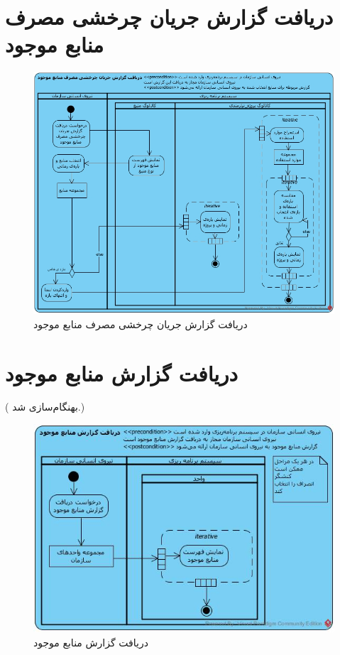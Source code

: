 \section{دریافت گزارش جریان چرخشی مصرف منابع موجود}
\begin{figure}[H]
	\centering
	\includegraphics[scale=0.6]{img/activity/UsageFlowReport}
	\caption{دریافت گزارش جریان چرخشی مصرف منابع موجود}
\end{figure}


\newpage
\section{دریافت گزارش منابع موجود}
({\color{red} بهنگام‌سازی شد.})
\begin{figure}[H]
	\centering
	\includegraphics[scale=0.7]{img/activity/AvailableResourcesReport}
	\caption{دریافت گزارش منابع موجود}
\end{figure}


